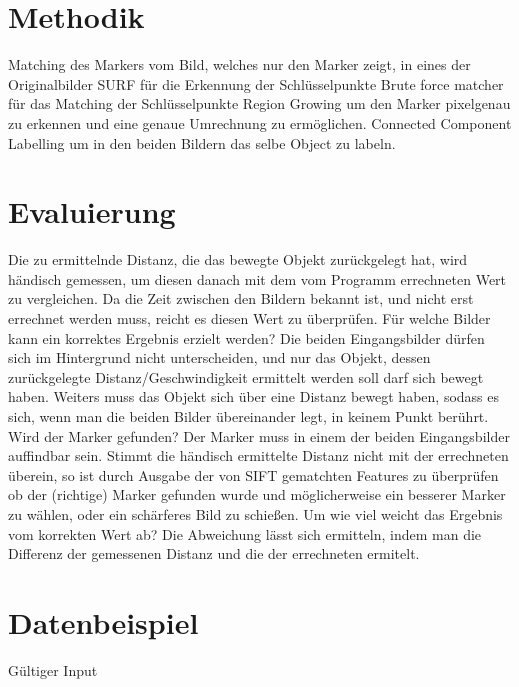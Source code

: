 \documentclass[deutsch]{scrartcl}
\begin{document}
\section{Methodik}
Matching des Markers vom Bild, welches nur den Marker zeigt, in eines der Originalbilder 
SURF für die Erkennung der Schlüsselpunkte
Brute force matcher für das Matching der Schlüsselpunkte
Region Growing um den Marker pixelgenau zu erkennen und eine genaue Umrechnung zu ermöglichen.
Connected Component Labelling um in den beiden Bildern das selbe Object zu labeln.

\section{Evaluierung}
Die zu ermittelnde Distanz, die das bewegte Objekt zurückgelegt hat, wird händisch gemessen, um diesen danach mit dem vom Programm errechneten Wert zu vergleichen. Da die Zeit zwischen den Bildern bekannt ist, und nicht erst errechnet werden muss, reicht es diesen Wert zu überprüfen.
Für welche Bilder kann ein korrektes Ergebnis erzielt werden? Die beiden Eingangsbilder dürfen sich im Hintergrund nicht unterscheiden, und nur das Objekt, dessen zurückgelegte Distanz/Geschwindigkeit ermittelt werden soll darf sich bewegt haben. Weiters muss das Objekt sich über eine Distanz bewegt haben, sodass es sich, wenn man die beiden Bilder übereinander legt, in keinem Punkt berührt.
Wird der Marker gefunden? Der Marker muss in einem der beiden Eingangsbilder auffindbar sein. Stimmt die händisch ermittelte Distanz nicht mit der errechneten überein, so ist durch Ausgabe der von SIFT gematchten Features zu überprüfen ob der (richtige) Marker gefunden wurde und möglicherweise ein besserer Marker zu wählen, oder ein schärferes Bild zu schießen.
Um wie viel weicht das Ergebnis vom korrekten Wert ab? Die Abweichung lässt sich ermitteln, indem man die Differenz der gemessenen Distanz und die der errechneten ermitelt.

\section{Datenbeispiel}
Gültiger Input
\end{document}
